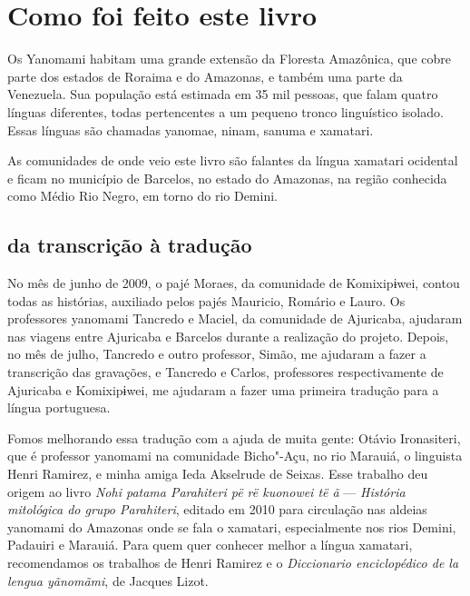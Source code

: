 \chapter{Como foi feito este livro}


\noindent{}Os Yanomami habitam uma grande extensão da Floresta Amazônica, que cobre
parte dos estados de Roraima e do Amazonas, e também uma parte da
Venezuela. Sua população está estimada em 35 mil pessoas, que falam
quatro línguas diferentes, todas pertencentes a um pequeno tronco
linguístico isolado. Essas línguas são chamadas yanomae, ninam, sanuma e
xamatari.

As comunidades de onde veio este livro são falantes da língua xamatari
ocidental e ficam no município de Barcelos, no estado do Amazonas, na
região conhecida como Médio Rio Negro, em torno do rio Demini.

\section{da transcrição à tradução}


No mês de junho de 2009, o pajé Moraes, da comunidade de Komixipɨwei,
contou todas as histórias, auxiliado pelos pajés Mauricio, Romário e
Lauro. Os professores yanomami Tancredo e Maciel, da comunidade de
Ajuricaba, ajudaram nas viagens entre Ajuricaba e Barcelos durante a
realização do projeto. Depois, no mês de julho, Tancredo e outro
professor, Simão, me ajudaram a fazer a transcrição das gravações, e
Tancredo e Carlos, professores respectivamente de Ajuricaba e
Komixipɨwei, me ajudaram a fazer uma primeira tradução para a língua
portuguesa.

Fomos melhorando essa tradução com a ajuda de muita gente: Otávio
Ironasiteri, que é professor yanomami na comunidade Bicho"-Açu, no rio
Marauiá, o linguista Henri Ramirez, e minha amiga Ieda Akselrude de
Seixas. Esse trabalho deu origem ao livro \textit{Nohi patama Parahiteri
pë rë kuonowei të ã} --- \textit{História mitológica do grupo Parahiteri},
editado em 2010 para circulação nas aldeias yanomami do Amazonas onde se
fala o xamatari, especialmente nos rios Demini, Padauiri e Marauiá. Para quem quer conhecer melhor a língua xamatari, recomendamos os trabalhos de Henri Ramirez e o \textit{Diccionario enciclopédico de la lengua yãnomãmi}, de Jacques Lizot.  

